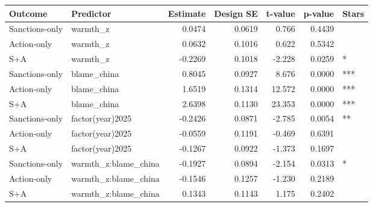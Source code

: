 
\begin{tabular}[t]{llrrrrl}
\toprule
Outcome & Predictor & Estimate & Design SE & t-value & p-value & Stars\\
\midrule
Sanctions-only & warmth\_z & 0.0474 & 0.0619 & 0.766 & 0.4439 & \\
Action-only & warmth\_z & 0.0632 & 0.1016 & 0.622 & 0.5342 & \\
S+A & warmth\_z & -0.2269 & 0.1018 & -2.228 & 0.0259 & *\\
Sanctions-only & blame\_china & 0.8045 & 0.0927 & 8.676 & 0.0000 & ***\\
Action-only & blame\_china & 1.6519 & 0.1314 & 12.572 & 0.0000 & ***\\
S+A & blame\_china & 2.6398 & 0.1130 & 23.353 & 0.0000 & ***\\
Sanctions-only & factor(year)2025 & -0.2426 & 0.0871 & -2.785 & 0.0054 & **\\
Action-only & factor(year)2025 & -0.0559 & 0.1191 & -0.469 & 0.6391 & \\
S+A & factor(year)2025 & -0.1267 & 0.0922 & -1.373 & 0.1697 & \\
Sanctions-only & warmth\_z:blame\_china & -0.1927 & 0.0894 & -2.154 & 0.0313 & *\\
Action-only & warmth\_z:blame\_china & -0.1546 & 0.1257 & -1.230 & 0.2189 & \\
S+A & warmth\_z:blame\_china & 0.1343 & 0.1143 & 1.175 & 0.2402 & \\
\bottomrule
\end{tabular}
